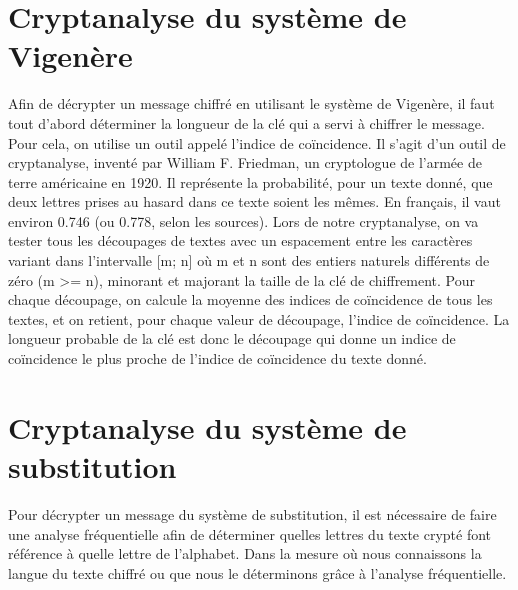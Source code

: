 	\section{Cryptanalyse du système de Vigenère}
		Afin de décrypter un message chiffré en utilisant le système de Vigenère, il faut tout d’abord déterminer la longueur de la clé qui a servi à chiffrer le message. Pour cela, on utilise un outil appelé l’indice de coïncidence.
		Il s’agit d’un outil de cryptanalyse, inventé par William F. Friedman, un cryptologue de l’armée de terre américaine en 1920. Il représente la probabilité, pour un texte donné, que deux lettres prises au hasard dans ce texte soient les mêmes.
		En français, il vaut environ 0.746 (ou 0.778, selon les sources).
		Lors de notre cryptanalyse, on va tester tous les découpages de textes avec un espacement entre les caractères variant dans l’intervalle [m; n] où m et n sont des entiers naturels différents de zéro (m >= n), minorant et majorant la taille de la clé de chiffrement. Pour chaque découpage, on calcule la moyenne des indices de coïncidence de tous les textes, et on retient, pour chaque valeur de découpage, l’indice de coïncidence. La longueur probable de la clé est donc le découpage qui donne un indice de coïncidence le plus proche de l’indice de coïncidence du texte donné.
	\section{Cryptanalyse du système de substitution}
		Pour décrypter un message du système de substitution, il est 
		nécessaire de faire une analyse fréquentielle afin de déterminer
		quelles lettres du texte crypté font référence à quelle lettre de l'alphabet. Dans la mesure où nous connaissons la langue du texte chiffré ou que nous le déterminons grâce à l'analyse fréquentielle.  
		